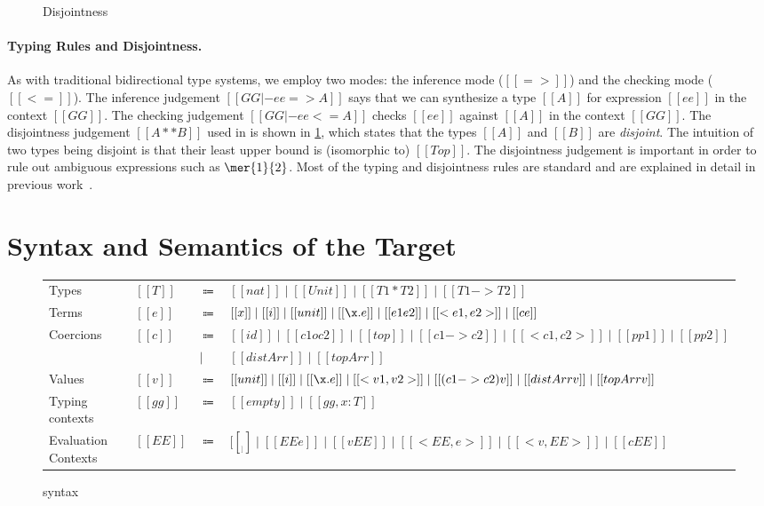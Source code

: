 \begin{figure}[t]
  \centering
  \caption{Disjointness}
  \label{fig:disjoint}
\end{figure}


\paragraph{Typing Rules and Disjointness.}

As with traditional bidirectional type systems, we employ two modes: the
inference mode ($[[=>]]$) and the checking mode ($[[<=]]$). The inference
judgement $[[GG |- ee => A]]$ says that we can synthesize a type $[[A]]$ for
expression $[[ee]]$ in the context $[[GG]]$. The checking judgement $[[GG |- ee
<= A]]$ checks $[[ee]]$ against $[[A]]$ in the context $[[GG]]$. The
disjointness judgement $[[A ** B]]$ used in  is shown in
\cref{fig:disjoint}, which states that the types $[[A]]$ and $[[B]]$ are
\textit{disjoint}. The intuition of two types being disjoint is
that their least upper bound is (isomorphic to) $[[Top]]$. The disjointness judgement is
important in order to rule out ambiguous expressions such as $\mer{1}{2}$. Most
of the typing and disjointness rules are standard and are explained in detail in
previous work~\citep{oliveira2016disjoint, alpuimdisjoint}.



\section{Syntax and Semantics of the Target}
\label{sec:elaboration}

\begin{figure}[t]
  \centering
\begin{tabular}{llll} \toprule
  Types & $[[T]]$ & $\Coloneqq$ & $[[nat]] \mid [[Unit]] \mid [[T1 * T2]] \mid [[T1 -> T2]] $ \\
  Terms & $[[e]]$ & $\Coloneqq$ & $[[x]] \mid [[i]] \mid [[unit]] \mid [[\x . e]] \mid [[e1 e2]] \mid [[<e1, e2>]] \mid [[c e]]$ \\
  Coercions & $[[c]]$ & $\Coloneqq$ & $ [[id]] \mid [[c1 o c2]] \mid [[top]] \mid [[c1 -> c2]] \mid [[<c1, c2>]] \mid [[pp1]] \mid [[pp2]] $ \\
  &  &  $\mid$ & $   [[distArr]] \mid [[topArr]]  $ \\
  Values & $[[v]]$ & $\Coloneqq$ & $[[unit]] \mid [[i]] \mid [[\x.e]] \mid  [[<v1, v2>]] \mid [[(c1 -> c2) v]] \mid [[distArr v]] \mid [[topArr v]] $ \\
  Typing contexts & $[[gg]]$ & $\Coloneqq$ & $[[empty]] \mid [[gg , x : T]]$ \\
  Evaluation Contexts & $[[EE]]$ & $\Coloneqq$ &  $  [[__]] \mid [[EE e]] \mid [[v EE]] \mid [[ < EE , e >  ]] \mid [[ < v , EE > ]] \mid [[ c EE  ]]$ \\ \bottomrule
\end{tabular}
  \caption{\tname syntax}
  \label{fig:target}
\end{figure}

